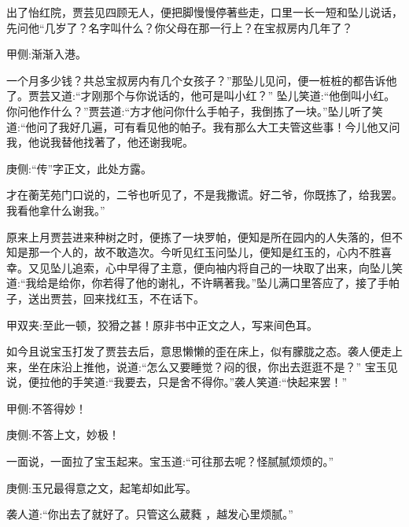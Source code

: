 \begin{parag}
    出了怡红院，贾芸见四顾无人，便把脚慢慢停著些走，口里一长一短和坠儿说话，先问他“几岁了？名字叫什么？你父母在那一行上？在宝叔房内几年了？\begin{note}甲侧:渐渐入港。\end{note}一个月多少钱？共总宝叔房内有几个女孩子？”那坠儿见问，便一桩桩的都告诉他了。贾芸又道:“才刚那个与你说话的，他可是叫小红？” 坠儿笑道:“他倒叫小红。你问他作什么？”贾芸道:“方才他问你什么手帕子，我倒拣了一块。”坠儿听了笑道:“他问了我好几遍，可有看见他的帕子。我有那么大工夫管这些事！今儿他又问我，他说我替他找著了，他还谢我呢。\begin{note}庚侧:“传”字正文，此处方露。\end{note}才在蘅芜苑门口说的，二爷也听见了，不是我撒谎。好二爷，你既拣了，给我罢。我看他拿什么谢我。”
\end{parag}


\begin{parag}
    原来上月贾芸进来种树之时，便拣了一块罗帕，便知是所在园内的人失落的，但不知是那一个人的，故不敢造次。今听见红玉问坠儿，便知是红玉的，心内不胜喜幸。又见坠儿追索，心中早得了主意，便向袖内将自己的一块取了出来，向坠儿笑道:“我给是给你，你若得了他的谢礼，不许瞒著我。”坠儿满口里答应了，接了手帕子，送出贾芸，回来找红玉，不在话下。\begin{note}甲双夹:至此一顿，狡猾之甚！原非书中正文之人，写来间色耳。\end{note}
\end{parag}


\begin{parag}
    如今且说宝玉打发了贾芸去后，意思懒懒的歪在床上，似有朦胧之态。袭人便走上来，坐在床沿上推他，说道:“怎么又要睡觉？闷的很，你出去逛逛不是？” 宝玉见说，便拉他的手笑道:“我要去，只是舍不得你。”袭人笑道:“快起来罢！”\begin{note}甲侧:不答得妙！\end{note}\begin{note}庚侧:不答上文，妙极！\end{note}一面说，一面拉了宝玉起来。宝玉道:“可往那去呢？怪腻腻烦烦的。”\begin{note}庚侧:玉兄最得意之文，起笔却如此写。\end{note}袭人道:“你出去了就好了。只管这么葳蕤 ，越发心里烦腻。”
\end{parag}


